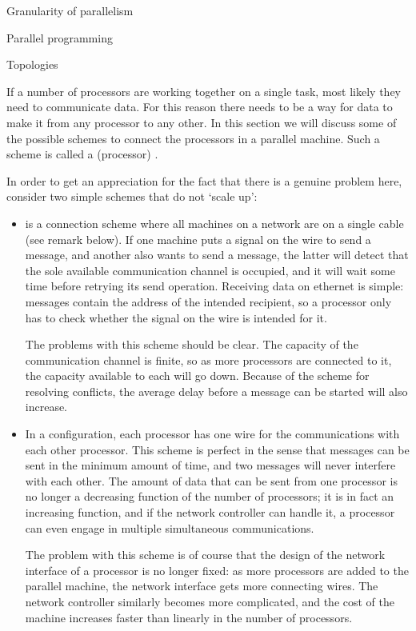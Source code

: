  {Granularity of parallelism}


 {Parallel programming}


 {Topologies}
\label{sec:parallel-topology}

If a number of processors are working together on a single task, most
likely they need to communicate data. For this reason there needs to
be a way for data to make it from any processor to any other. In this
section we will discuss some of the possible schemes to connect the
processors in a parallel machine. Such a scheme is called a
(processor) .

In order to get an appreciation for the fact that there is a genuine
problem here, consider two
simple schemes that do not `scale up':
\begin{itemize}
\item {} is a connection scheme where all machines on a network
  are on a single cable (see remark below).
  If one
  machine puts a signal on the wire to send a message, and another
  also wants to send a message, the latter will detect that the sole
  available communication channel is occupied, and it will wait some
  time before retrying its send operation. Receiving data on ethernet
  is simple: messages contain the address of the intended recipient,
  so a processor only has to check whether the signal on the wire is
  intended for it.

  The problems with this scheme should be clear. The capacity of the
  communication channel is finite, so as more processors are connected
  to it, the capacity available to each will go down. Because of the
  scheme for resolving conflicts, the average delay before a message
  can be started will also increase.
\item In a  configuration,
  each processor has one wire for
  the communications with each other processor. This scheme is perfect
  in the sense that messages can be sent in the minimum amount of time,
  and two messages will never interfere with each other.
  The amount of data that can be sent from one
  processor is no longer a decreasing function of the number of
  processors; it is in fact an increasing function, and if the
  network controller can handle it, a processor can even engage in
  multiple simultaneous communications.

  The problem with this scheme is of course that the design of the
  network interface of a processor 
  is no longer fixed: as more processors are added
  to the parallel machine, the network interface gets more
  connecting wires. The network controller similarly becomes 
  more complicated, and the cost of the machine increases faster than
  linearly in the number of processors.
\end{itemize}

